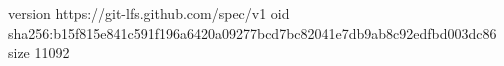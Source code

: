 version https://git-lfs.github.com/spec/v1
oid sha256:b15f815e841c591f196a6420a09277bcd7bc82041e7db9ab8c92edfbd003dc86
size 11092
